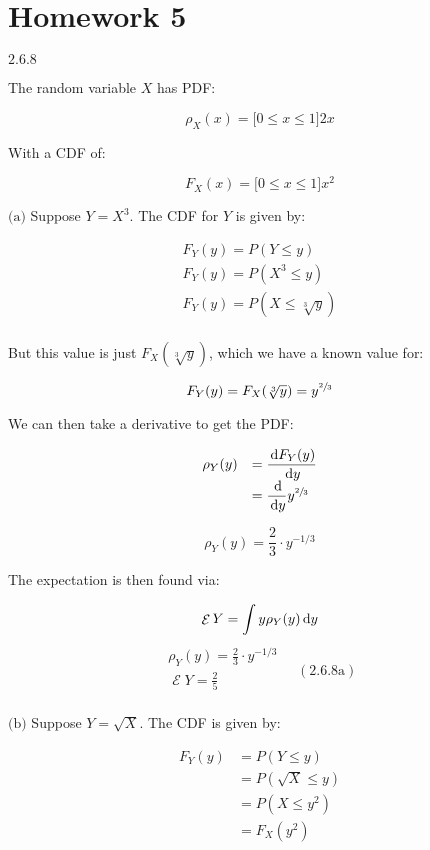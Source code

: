\documentclass{article}
\newcommand{\problem}[2]{$\boxed{\text{#1.#2}}$}
\newcommand{\subproblem}[3]{$\boxed{\text{(#3)}}$}
\newcommand{\subsolution}[4]{\boxed{#4\quad(\text{#1.#2#3})}}
\renewcommand{\d}[1]{\,\textnormal{d}#1}
\newcommand{\ddd}[2]{\dfrac{\d{#1}}{\d{#2}}}
\DeclareMathOperator{\E}{\mathcal{E}}
\begin{document}
\section*{Homework 5}

%
\problem{2.6}{8}

The random variable $X$ has PDF:

\[
\rho_X(x)=\lbrack0\le x\le1\rbrack2x
\]

With a CDF of:

\[
F_X(x)=\lbrack0\le x\le1\rbrack x^2
\]

%
\subproblem{2.6}{8}{a} Suppose $Y=X^3$. The CDF for $Y$ is given by:

\[
\begin{array}{l}
F_Y(y)=P(Y\le y) \\
F_Y(y)=P(X^3\le y) \\
F_Y(y)=P(X\le \sqrt[3]{y}) \\
\end{array}
\]

But this value is just $F_X(\sqrt[3]{y})$, which we have a known value
for:

\[
F_Y(y)=F_X(\sqrt[3]{y})=y^{\sfrac{2}{3}}
\]

We can then take a derivative to get the PDF:

\[
\begin{array}{ll}
\rho_Y(y) &=\ddd{F_Y(y)}{y} \\
&=\ddd{}{y} y^{\sfrac{2}{3}} \\
\end{array}
\]

\[
\rho_Y(y)=\frac{2}{3}\cdot y^{-1/3}
\]

The expectation is then found via:

\[
\E Y=\int y \rho_Y(y)\d{y}
\] \[
\subsolution{2.6}{8}{a}{\begin{array}{l}
\rho_Y(y)=\frac{2}{3}\cdot y^{-1/3} \\
\E Y=\frac{2}{5} \\
\end{array}}
\]

%
\subproblem{2.6}{8}{b} Suppose $Y=\sqrt{X}$. The CDF is given by:

\[
\begin{array}{ll}
F_Y(y)&=P(Y\le y) \\
&=P(\sqrt{X}\le y) \\
&=P(X\le y^2) \\
&=F_X(y^2) \\
\end{array}
\]
\end{document}
